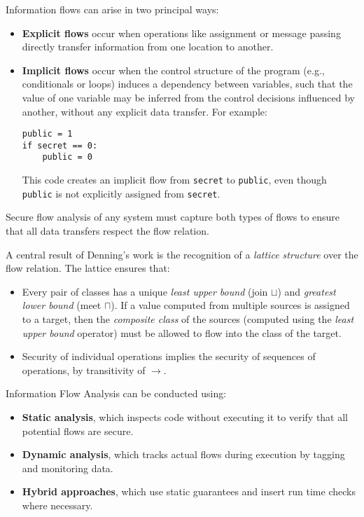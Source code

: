\documentclass[12pt,a4paper,twoside]{book}
\begin{document}
Information flows can arise in two principal ways:
\begin{itemize}
  \item \textbf{Explicit flows} occur when operations like assignment or message passing directly transfer information from one location to another.
  \item \textbf{Implicit flows} occur when the control structure of the program (e.g., conditionals or loops) induces a dependency between variables, such that the value of one variable may be inferred from the control decisions influenced by another, without any explicit data transfer. For example:
\begin{lstlisting}[caption={Example of implicit flow}, label={lst:implicit_flow}]
public = 1
if secret == 0:
    public = 0
\end{lstlisting}
This code creates an implicit flow from \texttt{secret} to \texttt{public}, even though \texttt{public} is not explicitly assigned from \texttt{secret}.
\end{itemize}
Secure flow analysis of any system must capture both types of flows to ensure that all data transfers respect the flow relation.

A central result of Denning’s work is the recognition of a \textit{lattice structure} over the flow relation. The lattice ensures that:
\begin{itemize}
  \item Every pair of classes has a unique \textit{least upper bound} (join \( \sqcup \)) and \textit{greatest lower bound} (meet \( \sqcap \)).
If a value computed from multiple sources is assigned to a target, then the \textit{composite class} of the sources (computed using the \textit{least upper bound} operator) must be allowed to flow into the class of the target.
  \item Security of individual operations implies the security of sequences of operations, by transitivity of $\rightarrow$.
\end{itemize}

Information Flow Analysis can be conducted using:
\begin{itemize}
  \item \textbf{Static analysis}, which inspects code without executing it to verify that all potential flows are secure.
  \item \textbf{Dynamic analysis}, which tracks actual flows during execution by tagging and monitoring data.
  \item \textbf{Hybrid approaches}, which use static guarantees and insert run time checks where necessary.
\end{itemize}
\end{document}
